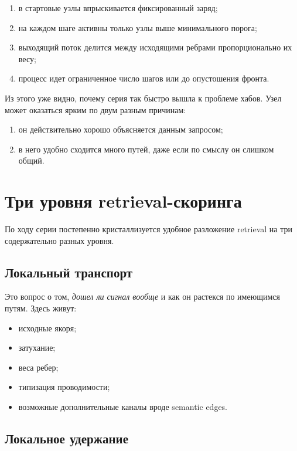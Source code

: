 \begin{enumerate}[leftmargin=2em]
\item в стартовые узлы впрыскивается фиксированный заряд;
\item на каждом шаге активны только узлы выше минимального порога;
\item выходящий поток делится между исходящими ребрами пропорционально их весу;
\item процесс идет ограниченное число шагов или до опустошения фронта.
\end{enumerate}

Из этого уже видно, почему серия так быстро вышла к проблеме хабов. Узел может
оказаться ярким по двум разным причинам:

\begin{enumerate}[leftmargin=2em]
\item он действительно хорошо объясняется данным запросом;
\item в него удобно сходится много путей, даже если по смыслу он слишком общий.
\end{enumerate}

\section{Три уровня retrieval-скоринга}

По ходу серии постепенно кристаллизуется удобное разложение retrieval на три
содержательно разных уровня.

\subsection{Локальный транспорт}

Это вопрос о том, \emph{дошел ли сигнал вообще} и как он растекся по имеющимся
путям. Здесь живут:

\begin{itemize}[leftmargin=2em]
\item исходные якоря;
\item затухание;
\item веса ребер;
\item типизация проводимости;
\item возможные дополнительные каналы вроде semantic edges.
\end{itemize}

\subsection{Локальное удержание}

